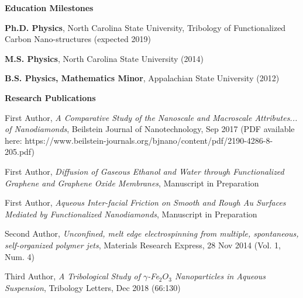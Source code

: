 \documentclass[letterpaper,final]{memoir}
\newcommand{\Sep}{\vspace{1.0em}}
\newcommand{\SmallSep}{\vspace{0.4em}}
\newcommand{\CVSection}[1]
	{\LARGE\textbf{#1}\par
	\SmallSep\normalsize}
\begin{document}
\Sep


\newpage

\notoserif \CVSection{Education Milestones}
\normalfont
\Sep
\begin{compactitem}[\color{Blue}$\circ$]

\item \textbf{Ph.D. Physics}, North Carolina State University, Tribology of Functionalized Carbon Nano-structures (expected 2019)
\SmallSep

\item \textbf{M.S. Physics}, North Carolina State University (2014)
\SmallSep

\item \textbf{B.S. Physics, Mathematics Minor}, Appalachian State University (2012)

\end{compactitem}
\Sep



\notoserif \CVSection{Research Publications}
\normalfont

\Sep

\begin{compactitem}[\color{Blue}$\circ$]
	 
    \item First Author, \textit{A Comparative Study of the Nanoscale and Macroscale Attributes... of Nanodiamonds}, Beilstein Journal of Nanotechnology, Sep 2017 (PDF available here: https://www.beilstein-journals.org/bjnano/content/pdf/2190-4286-8-205.pdf)
    \SmallSep

    \item First Author, \textit{Diffusion of Gaseous Ethanol and Water through Functionalized Graphene and Graphene Oxide Membranes}, Manuscript in Preparation
    \SmallSep

    \item First Author, \textit{Aqueous Inter-facial Friction on Smooth and Rough Au Surfaces Mediated by Functionalized Nanodiamonds}, Manuscript in Preparation
    \SmallSep
    
    \item Second Author, \textit{Unconfined, melt edge electrospinning from multiple, spontaneous, self-organized polymer jets}, Materials Research Express, 28 Nov 2014 (Vol. 1, Num. 4)
    \SmallSep

    \item Third Author, \textit{A Tribological Study of $\gamma$-Fe$_{2}O_{3}$ Nanoparticles in Aqueous Suspension}, Tribology Letters, Dec 2018 (66:130)
	
\end{compactitem}
\end{document}
